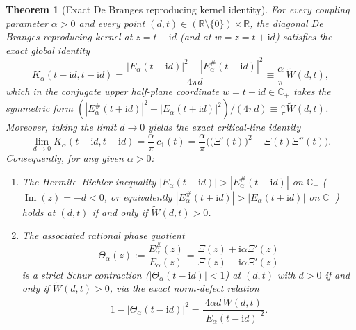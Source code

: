 \documentclass[11pt,reqno,a4paper]{amsart}
\theoremstyle{plain}
\newtheorem{theorem}{Theorem}[section]
\theoremstyle{definition}
\theoremstyle{remark}
\numberwithin{equation}{section}
\newcommand{\ii}{\mathrm{i}}
\begin{document}
\begin{theorem}[Exact De Branges reproducing kernel identity]\label{thm:debranges_kernel}
For every coupling parameter $\alpha > 0$ and every point $(d,t) \in (\mathbb{R}\setminus\{0\}) \times \mathbb{R}$, the diagonal De Branges reproducing kernel at $z = t - \ii d$ (and at $w = \bar{z} = t + \ii d$) satisfies the exact global identity
\begin{equation}\label{eq:debranges_boxed}
  \boxed{
    K_\alpha(t - \ii d, t - \ii d)
    = \frac{|E_\alpha(t - \ii d)|^2 - |E_\alpha^\#(t - \ii d)|^2}{4\pi d}
    \equiv \frac{\alpha}{\pi}\,\widetilde{W}(d,t),
  }
\end{equation}
which in the conjugate upper half-plane coordinate $w = t + \ii d \in \mathbb{C}_+$ takes the symmetric form $(|E_\alpha^\#(t + \ii d)|^2 - |E_\alpha(t + \ii d)|^2)/(4\pi d) \equiv \frac{\alpha}{\pi}\widetilde{W}(d,t)$.
Moreover, taking the limit $d \to 0$ yields the exact critical-line identity
\begin{equation}\label{eq:debranges_d0}
  \lim_{d \to 0} K_\alpha(t - \ii d, t - \ii d)
  = \frac{\alpha}{\pi}\,c_1(t)
  = \frac{\alpha}{\pi}\Big(\big(\Xi'(t)\big)^2 - \Xi(t)\Xi''(t)\Big).
\end{equation}
Consequently, for any given $\alpha > 0$:
\begin{enumerate}[label=\textup{(\roman*)},leftmargin=2.2em]
  \item The Hermite--Biehler inequality $|E_\alpha(t - \ii d)| > |E_\alpha^\#(t - \ii d)|$ on $\mathbb{C}_-$ ($\operatorname{Im}(z) = -d < 0$, or equivalently $|E_\alpha^\#(t + \ii d)| > |E_\alpha(t + \ii d)|$ on $\mathbb{C}_+$) holds at $(d,t)$ if and only if $\widetilde{W}(d,t) > 0$.
  \item The associated rational phase quotient
  \begin{equation}\label{eq:Theta_alpha_def}
    \Theta_\alpha(z) := \frac{E_\alpha^\#(z)}{E_\alpha(z)} = \frac{\Xi(z) + \ii\alpha\Xi'(z)}{\Xi(z) - \ii\alpha\Xi'(z)}
  \end{equation}
  is a strict Schur contraction ($|\Theta_\alpha(t-\ii d)| < 1$) at $(d,t)$ with $d > 0$ if and only if $\widetilde{W}(d,t) > 0$, via the exact norm-defect relation
  \begin{equation}\label{eq:schur_defect}
    1 - \big|\Theta_\alpha(t - \ii d)\big|^2 = \frac{4\alpha d\,\widetilde{W}(d,t)}{|E_\alpha(t - \ii d)|^2}.
  \end{equation}
\end{enumerate}
\end{theorem}
\end{document}

